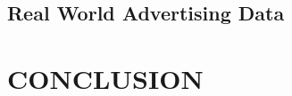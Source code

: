 \documentclass[twoside]{article}
\begin{document}
%
%
%
%

\subsection{Real World Advertising Data}

\section{CONCLUSION}





\end{document}
